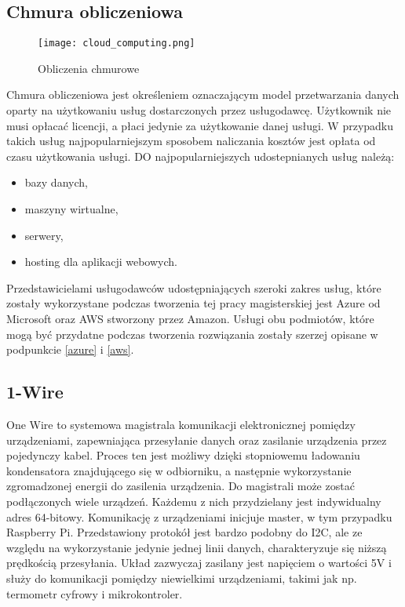 \subsection{Chmura obliczeniowa}
\begin{figure}[H]
	\centering
	\texttt{[image: cloud\_computing.png]}
	\caption{Obliczenia chmurowe}
	\label{fig:schemat_mvc}
\end{figure}
Chmura obliczeniowa jest określeniem oznaczającym model przetwarzania danych oparty na użytkowaniu usług dostarczonych przez usługodawcę. Użytkownik nie musi opłacać licencji, a płaci jedynie za użytkowanie danej usługi. W przypadku takich usług najpopularniejszym sposobem naliczania kosztów jest opłata od czasu użytkowania usługi.
DO najpopularniejszych udostepnianych usług należą:
\begin{itemize}
\item bazy danych,
\item maszyny wirtualne,
\item serwery,
\item hosting dla aplikacji webowych.
\end{itemize}
Przedstawicielami usługodawców udostępniających szeroki zakres usług, które zostały wykorzystane podczas tworzenia tej pracy magisterskiej jest Azure od Microsoft oraz AWS stworzony przez Amazon. Usługi obu podmiotów, które mogą być przydatne podczas tworzenia rozwiązania zostały szerzej opisane w podpunkcie \ref{azure} i \ref{aws}.
\subsection{1-Wire} \label{1wire}
One Wire to systemowa magistrala komunikacji elektronicznej pomiędzy urządzeniami, zapewniająca przesyłanie danych oraz zasilanie urządzenia przez pojedynczy kabel. Proces ten jest możliwy dzięki stopniowemu ładowaniu kondensatora znajdującego się w odbiorniku, a następnie wykorzystanie zgromadzonej energii do zasilenia urządzenia. Do magistrali może zostać podłączonych wiele urządzeń. Każdemu z nich przydzielany jest indywidualny adres 64-bitowy. Komunikację z urządzeniami inicjuje master, w tym przypadku Raspberry Pi.
Przedstawiony protokół jest bardzo podobny do I2C, ale ze względu na wykorzystanie jedynie jednej linii danych, charakteryzuje się niższą prędkością przesyłania. Układ zazwyczaj zasilany jest napięciem o wartości 5V i służy do komunikacji pomiędzy niewielkimi urządzeniami, takimi jak np. termometr cyfrowy i mikrokontroler.

